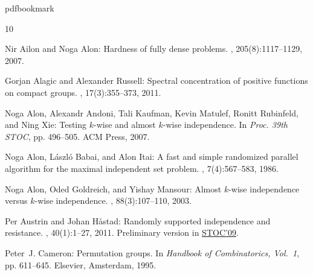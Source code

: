 %
%
%
%
%
\providecommand{\bibhead}[1]{}
%
\expandafter\ifx\csname pdfbookmark\endcsname\relax%
  \providecommand{\tocrefpdfbookmark}{}
\else\providecommand{\tocrefpdfbookmark}{%
   \hypertarget{tocreferences}{}%
   \pdfbookmark[1]{References}{tocreferences}}%
\fi

\tocrefpdfbookmark
\begin{thebibliography}{10}

\bibhead{AA07}
{\sc Nir Ailon and Noga Alon}: Hardness of fully dense problems.
, 205(8):1117--1129, 2007.
\newblock [\epfmtdoi{10.1016/j.ic.2007.02.006}]

\bibhead{AlagicRussell11}
{\sc Gorjan Alagic and Alexander Russell}: Spectral concentration of positive
  functions on compact groups.
, 17(3):355--373, 2011.
\newblock [\epfmtdoi{10.1007/s00041-011-9174-5}]

\bibhead{AAKMRX07}
{\sc Noga Alon, Alexandr Andoni, Tali Kaufman, Kevin Matulef, Ronitt Rubinfeld,
  and Ning Xie}: Testing $k$-wise and almost $k$-wise independence.
\newblock In {\em Proc. 39th STOC}, pp. 496--505. ACM Press, 2007.
\newblock [\epfmtdoi{10.1145/1250790.1250863}]

\bibhead{AlonBabaiItai86}
{\sc Noga Alon, L\'{a}szl\'{o} Babai, and Alon Itai}: A fast and simple
  randomized parallel algorithm for the maximal independent set problem.
, 7(4):567--583, 1986.
\newblock [\epfmtdoi{10.1016/0196-6774(86)90019-2}]

\bibhead{AlonGoldreichMansour03}
{\sc Noga Alon, Oded Goldreich, and Yishay Mansour}: Almost $k$-wise
  independence versus $k$-wise independence.
, 88(3):107--110, 2003.
\newblock [\epfmtdoi{10.1016/S0020-0190(03)00359-4}]

\bibhead{AustrinHastad11}
{\sc Per Austrin and Johan H{\aa}stad}: Randomly supported independence and
  resistance.
, 40(1):1--27, 2011.
\newblock Preliminary version in
  \href{http://dx.doi.org/10.1145/1536414.1536481}{STOC'09}.
\newblock [\epfmtdoi{10.1137/100783534}]

\bibhead{Cameron95}
{\sc Peter~J. Cameron}: Permutation groups.
\newblock In {\em Handbook of Combinatorics, {V}ol.\ 1}, pp. 611--645.
  Elsevier, Amsterdam, 1995.


\end{thebibliography}
